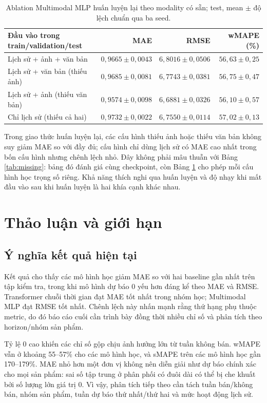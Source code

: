 \documentclass[12pt,a4paper,oneside]{article}
\begin{document}
\begin{table}[!htbp]
\centering
\small
\caption{Ablation Multimodal MLP huấn luyện lại theo modality có sẵn; test, mean $\pm$ độ lệch chuẩn qua ba seed.}
\label{tab:retrained}
\begin{tabular}{lrrr}
\toprule
Đầu vào trong train/validation/test & MAE & RMSE & wMAPE (\%) \\
\midrule
Lịch sử + ảnh + văn bản & $0,9665\pm0,0043$ & $6,8016\pm0,0506$ & $56,63\pm0,25$ \\
Lịch sử + văn bản (thiếu ảnh) & $0,9685\pm0,0081$ & $6,7743\pm0,0381$ & $56,75\pm0,47$ \\
Lịch sử + ảnh (thiếu văn bản) & $0,9574\pm0,0098$ & $6,6881\pm0,0326$ & $56,10\pm0,57$ \\
Chỉ lịch sử (thiếu cả hai) & $0,9732\pm0,0022$ & $6,7550\pm0,0114$ & $57,02\pm0,13$ \\
\bottomrule
\end{tabular}
\end{table}

Trong giao thức huấn luyện lại, các cấu hình thiếu ảnh hoặc thiếu văn bản không suy giảm MAE so với đầy đủ; cấu hình chỉ dùng lịch sử có MAE cao nhất trong bốn cấu hình nhưng chênh lệch nhỏ. Đây không phải mâu thuẫn với Bảng \ref{tab:missing}: bảng đó đánh giá cùng checkpoint, còn Bảng \ref{tab:retrained} cho phép mỗi cấu hình học trọng số riêng. Khả năng thích nghi qua huấn luyện và độ nhạy khi mất đầu vào sau khi huấn luyện là hai khía cạnh khác nhau.

\section{Thảo luận và giới hạn}
\subsection{Ý nghĩa kết quả hiện tại}
Kết quả cho thấy các mô hình học giảm MAE so với hai baseline gần nhất trên tập kiểm tra, trong khi mô hình dự báo 0 yếu hơn đáng kể theo MAE và RMSE. Transformer chuỗi thời gian đạt MAE tốt nhất trong nhóm học; Multimodal MLP đạt RMSE tốt nhất. Chênh lệch này nhấn mạnh rằng thứ hạng phụ thuộc metric, do đó báo cáo cuối cần trình bày đồng thời nhiều chỉ số và phân tích theo horizon/nhóm sản phẩm.

Tỷ lệ 0 cao khiến các chỉ số gộp chịu ảnh hưởng lớn từ tuần không bán. wMAPE vẫn ở khoảng 55--57\% cho các mô hình học, và sMAPE trên các mô hình học gần 170--179\%. MAE nhỏ hơn một đơn vị không nên diễn giải như dự báo chính xác cho mọi sản phẩm: sai số tập trung ở phân phối có đuôi dài có thể bị che khuất bởi số lượng lớn giá trị 0. Vì vậy, phân tích tiếp theo cần tách tuần bán/không bán, nhóm sản phẩm, tuần dự báo thứ nhất/thứ hai và mức hoạt động lịch sử.
\end{document}
